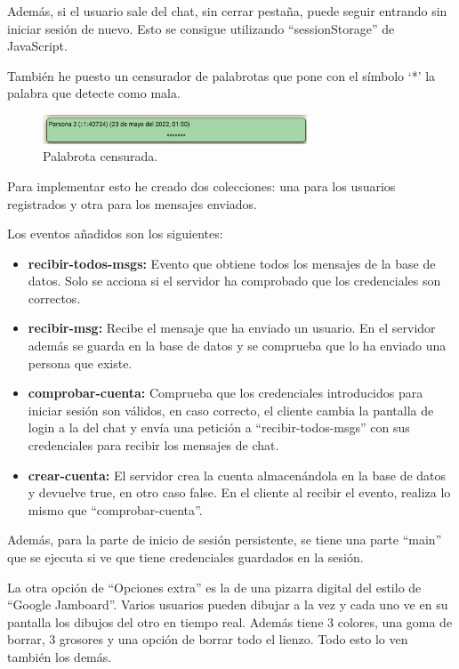 \documentclass{article}
\begin{document}
Además, si el usuario sale del chat, sin cerrar pestaña, puede seguir entrando sin iniciar sesión de nuevo. Esto se consigue utilizando ``sessionStorage'' de JavaScript.

También he puesto un censurador de palabrotas que pone con el símbolo `*' la palabra que detecte como mala.

\begin{figure}[H]
    \centering
    \includegraphics[width=0.7\textwidth]{images/censura.png}
    \caption{Palabrota censurada.}
\end{figure}

Para implementar esto he creado dos colecciones: una para los usuarios registrados y otra para los mensajes enviados.

Los eventos añadidos son los siguientes:

\begin{itemize}
    \item \textbf{recibir-todos-msgs: }Evento que obtiene todos los mensajes de la base de datos. Solo se acciona si el servidor ha comprobado que los credenciales son correctos.
    \item \textbf{recibir-msg: }Recibe el mensaje que ha enviado un usuario. En el servidor además se guarda en la base de datos y se comprueba que lo ha enviado una persona que existe.
    \item \textbf{comprobar-cuenta: }Comprueba que los credenciales introducidos para iniciar sesión son válidos, en caso correcto, el cliente cambia la pantalla de login a la del chat y envía una petición a ``recibir-todos-msgs'' con sus credenciales para recibir los mensajes de chat.
    \item \textbf{crear-cuenta: }El servidor crea la cuenta almacenándola en la base de datos y devuelve true, en otro caso false. En el cliente al recibir el evento, realiza lo mismo que ``comprobar-cuenta''.
\end{itemize}    

Además, para la parte de inicio de sesión persistente, se tiene una parte ``main'' que se ejecuta si ve que tiene credenciales guardados en la sesión.


La otra opción de ``Opciones extra'' es la de una pizarra digital del estilo de ``Google Jamboard''. Varios usuarios pueden dibujar a la vez y cada uno ve en su pantalla los dibujos del otro en tiempo real. Además tiene 3 colores, una goma de borrar, 3 grosores y una opción de borrar todo el lienzo. Todo esto lo ven también los demás.
\end{document}
